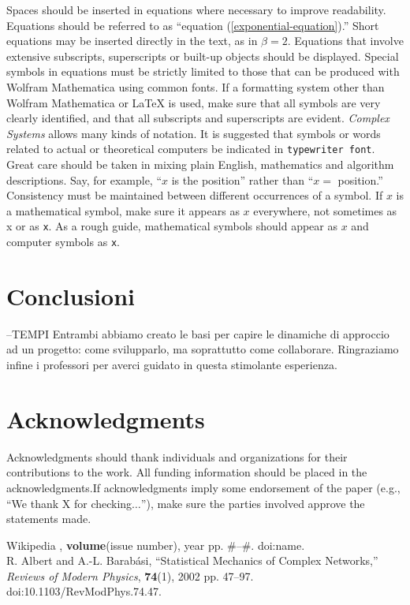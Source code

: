 \documentclass{article}
\begin{document}
Spaces should be inserted in equations where necessary to improve readability. Equations should be referred to as {``}equation (\ref{exponential-equation}).{''} Short equations may be inserted directly in the text, as in \(\beta =2\). Equations that involve extensive subscripts, superscripts or built-up objects should be displayed. Special symbols in equations must be strictly limited to those that can be produced with Wolfram Mathematica using common fonts.
If a formatting system other than Wolfram Mathematica or LaTeX is used, make sure that all symbols are very clearly identified, and that all subscripts and superscripts are evident. \textit{Complex Systems} allows many kinds of notation. It is suggested that symbols or words related to actual or theoretical computers be indicated in \texttt{typewriter font}. 
Great care should be taken in mixing plain English, mathematics and algorithm descriptions. Say, for example, {``}\(x\) is the position{''} rather than {``}\(x=\) position.{''} Consistency must be maintained between different occurrences of a symbol. If \(x\) is a mathematical symbol, make sure it appears as \(x\) everywhere, not sometimes as x or as \texttt{x}. As a rough guide, mathematical symbols should appear as \(x\) and computer symbols as \texttt{x}. 
\section{Conclusioni}
--TEMPI 
Entrambi abbiamo creato le basi per capire le dinamiche di approccio ad un progetto: come svilupparlo, ma soprattutto come collaborare. Ringraziamo infine i professori per averci guidato in questa stimolante esperienza.
\section*{Acknowledgments}
Acknowledgments should thank individuals and organizations for their contributions to the work. All funding information should be placed in the acknowledgments.If acknowledgments imply some endorsement of the paper (e.g., {``}We thank X for checking\(\ldots\){''}), make sure the parties involved approve the statements made.
\begin{thebibliography}{99}
Wikipedia \textit{}, \textbf{volume}(issue number), year pp. \#--\#.
doi:name.\\
R. Albert and A.-L. Barab{\' a}si, ``Statistical Mechanics of Complex
Networks,'' \textit{Reviews of Modern Physics}, \textbf{74}(1), 
2002 pp. 47--97.  doi:10.1103/RevModPhys.74.47.
\end{thebibliography}
\end{document}
